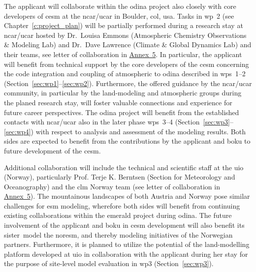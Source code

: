 
The applicant will collaborate within the \gls{odina} project also closely with core developers of \gls{cesm} at the \gls{ncar/ucar} in Boulder, \acrshort{col}, \acrshort{usa}. Tasks in \gls{wp}~2 (see Chapter~\ref{c:project_plan}) will be partially performed during a research stay at \gls{ncar/ucar} hosted by Dr.~Louisa Emmons (Atmospheric Chemistry Observations \& Modeling Lab) and Dr.~Dave Lawrence (Climate \& Global Dynamics Lab) and their teams, see letter of collaboration in \hyperref[fig:loi_ncar]{Annex~5}. 
In particular, the applicant will benefit from technical support by the core developers of the \gls{cesm} concerning the code integration and coupling of atmospheric \ch{[O_3]} to \gls{odina} described in \glspl{wp}~1--2 (Section~\ref{sec:wp1}--\ref{sec:wp2}). Furthermore, the offered guidance by the \gls{ncar/ucar} community, in particular by the land-modeling and atmospheric groups during the planed research stay, will foster valuable connections and experience for future career perspectives.
The \gls{odina} project will benefit from the established contacts with \gls{ncar/ucar} also in the later phase \glspl{wp}~3--4 (Section~\ref{sec:wp3}--\ref{sec:wp4}) with respect to analysis and assessment of the modeling results. Both sides are expected to benefit from the contributions by the applicant and \gls{boku} to future development of the \gls{cesm}.

Additional collaboration will include the technical and scientific staff at the \gls{uio} (Norway), particularly Prof. Terje K. Berntsen (Section for Meteorology and Oceanography) and the \gls{clm} Norway team (see letter of collaboration in \hyperref[fig:loi_uio]{Annex~5}). 
The mountainous landscapes of both Austria and Norway pose similar challenges for \gls{esm} modeling, wherefore both sides will benefit from continuing existing collaborations within the \gls{emerald} project during \gls{odina}. The future involvement of the applicant and \gls{boku} in \gls{cesm} development will also benefit its sister~model the \gls{noresm}, and thereby modeling initiatives of the Norwegian partners.
Furthermore, it is planned to utilize the potential of the land-modelling platform developed at \gls{uio} in collaboration with the applicant during her stay for the purpose of site-level model evaluation in \gls{wp}3 (Section~\ref{sec:wp3}). 